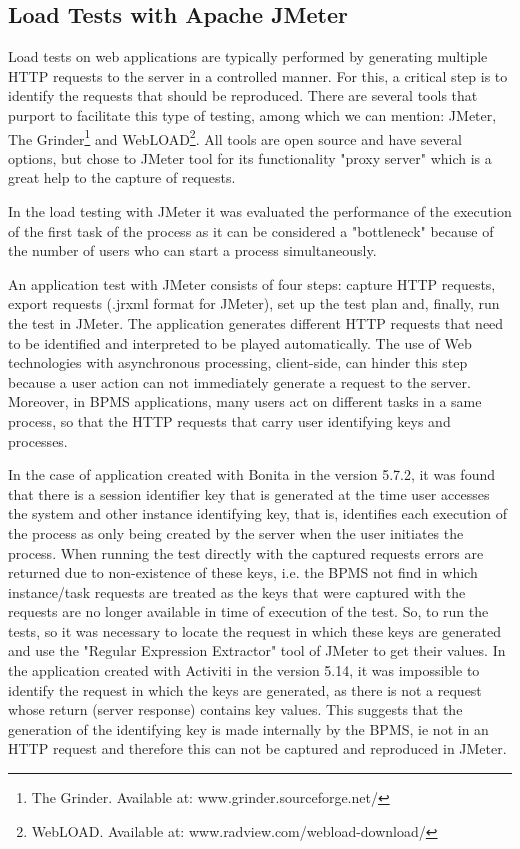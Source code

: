 \documentclass[runningheads,a4paper]{llncs}
\begin{document}
\subsection{Load Tests with Apache JMeter}
Load tests on web applications are typically performed by generating multiple HTTP requests to the server in a controlled manner. For this, a critical step is to identify the requests that should be reproduced. There are several tools that purport to facilitate this type of testing, among which we can mention: JMeter, The Grinder\footnote{The Grinder. Available at: www.grinder.sourceforge.net/} and WebLOAD\footnote{WebLOAD. Available at: www.radview.com/webload-download/}. All tools are open source and have several options, but chose to JMeter tool for its functionality "proxy server" which is a great help to the capture of requests.

In the load testing with JMeter it was evaluated the performance of the execution of the first task of the process as it can be considered a "bottleneck" because of the number of users who can start a process simultaneously.

An application test with JMeter consists of four steps: capture HTTP requests, export requests (.jrxml format for JMeter), set up the test plan and, finally, run the test in JMeter. The application generates different HTTP requests that need to be identified and interpreted to be played automatically. The use of Web technologies with asynchronous processing, client-side, can hinder this step because a user action can not immediately generate a request to the server. Moreover, in BPMS applications, many users act on different tasks in a same process, so that the HTTP requests that carry user identifying keys and processes.

In the case of application created with Bonita in the version 5.7.2, it was found that there is a session identifier key that is generated at the time user accesses the system and other instance identifying key, that is, identifies each execution of the process as only being created by the server when the user initiates the process. When running the test directly with the captured requests errors are returned due to non-existence of these keys, i.e. the BPMS not find in which instance/task requests are treated as the keys that were captured with the requests are no longer available in time of execution of the test. So, to run the tests, so it was necessary to locate the request in which these keys are generated and use the "Regular Expression Extractor" tool of JMeter to get their values. In the application created with Activiti in the version 5.14, it was impossible to identify the request in which the keys are generated, as there is not a request whose return (server response) contains key values. This suggests that the generation of the identifying key is made internally by the BPMS, ie not in an HTTP request and therefore this can not be captured and reproduced in JMeter.
\end{document}
